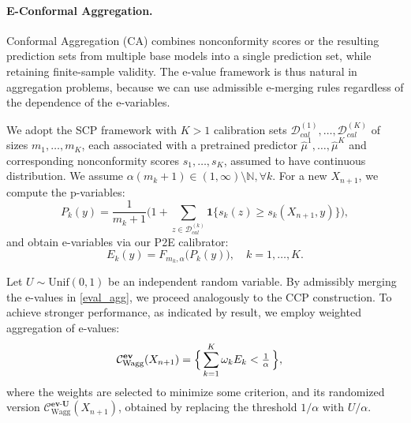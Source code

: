 \documentclass{article}
\theoremstyle{plain}
\theoremstyle{definition}
\theoremstyle{remark}
\begin{document}



\paragraph{E-Conformal Aggregation.}
\label{E-CA}
Conformal Aggregation (CA) combines nonconformity scores or the resulting prediction sets from multiple base models into a single prediction set, while retaining finite-sample validity.  
The e-value framework is thus natural in aggregation problems,  because we can use admissible e-merging rules regardless of the dependence of the e-variables. 

We adopt the SCP framework with $K>1$ calibration sets $\mathcal{D}_{cal}^{(1)},\dots,\mathcal{D}_{cal}^{(K)}$ of sizes $m_1,\dots,m_K$, each associated with a pretrained predictor $\hat{\mu}^1,\dots,\hat{\mu}^K$ and corresponding nonconformity scores $s_1,\dots,s_K$, assumed to have continuous distribution. We assume $\alpha(m_k+1)\in (1,\infty)\setminus\mathbb{N}, \forall k$. For a new $X_{n+1}$, we compute the p-variables:
\begin{equation}
\label{pval_agg}
    P_k(y) = \frac{1}{m_k+1}\Big(1 + \sum_{z\in \mathcal{D}_{cal}^{(k)}} \mathbf{1}\{s_k(z) \ge s_k(X_{n+1},y)\}\Big), 
\end{equation}
and obtain e-variables via our P2E calibrator:
\begin{equation}
\label{eval_agg}
    E_k(y) = F_{m_k,\alpha}\!\big(P_k(y)\big), \quad k=1,\dots,K.
\end{equation}



Let \(U \sim \mathrm{Unif}(0,1)\) be an independent random variable. By admissibly merging the e-values in \eqref{eval_agg}, we proceed analogously to the CCP construction. To achieve stronger performance, as indicated by \citet{wang2025only} result, we employ weighted aggregation of e-values:
\begin{align}
\label{WECA}
\mathcal{C}_{\text{Wagg}}^{\textbf{ev}}(X_{n+1}) 
   &= \Bigl\{\,   \sum_{k=1}^K \omega_k E_k < \tfrac{1}{\alpha} \,\Bigr\},
\end{align}
where the weights are selected to minimize some criterion,
and its randomized version 
$\mathcal{C}_{\text{Wagg}}^{\textbf{ev-U}}(X_{n+1})$,
obtained by replacing the threshold $1/\alpha$ with $U/\alpha$. 
\end{document}
